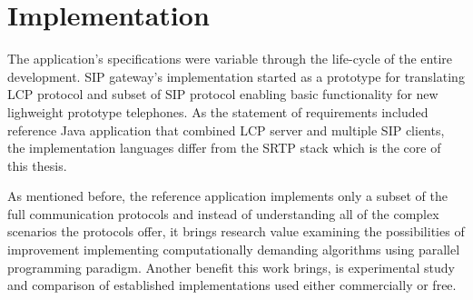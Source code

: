 \chapter{Implementation}\label{chapter:implementation}
The application's specifications were variable through the life-cycle of the 
entire development. SIP gateway's implementation started as a prototype for 
translating LCP protocol and subset of SIP protocol enabling basic functionality 
for  new lighweight prototype telephones. As the statement of requirements 
included reference Java application that combined LCP server and multiple SIP 
clients,  the implementation languages differ from the SRTP stack which is the 
core of this thesis.

As mentioned before, the reference application implements only a subset of 
the full communication protocols and instead of understanding all of the complex
scenarios the protocols offer, it brings research value examining 
the  possibilities of improvement implementing computationally demanding 
algorithms using parallel programming paradigm. Another benefit this work 
brings, is experimental study and comparison of established implementations used
either commercially or free.


